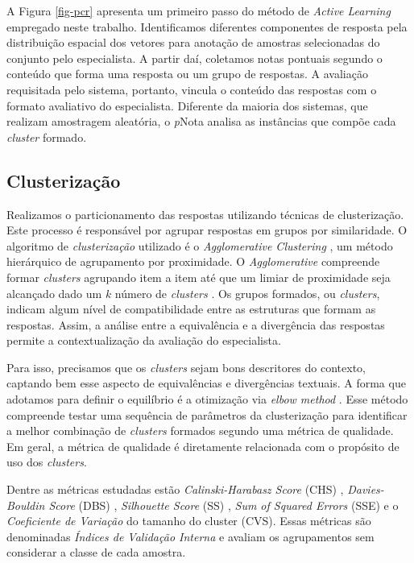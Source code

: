 A Figura \ref{fig-pcr} apresenta um primeiro passo do método de \textit{Active Learning} empregado neste trabalho. Identificamos diferentes componentes de resposta pela distribuição espacial dos vetores para anotação de amostras selecionadas do conjunto pelo especialista. A partir daí, coletamos notas pontuais segundo o conteúdo que forma uma resposta ou um grupo de respostas. A avaliação requisitada pelo sistema, portanto, vincula o conteúdo das respostas com o formato avaliativo do especialista. Diferente da maioria dos sistemas, que realizam amostragem aleatória, o \textit{p}Nota analisa as instâncias que compõe cada \textit{cluster} formado.


\subsection{Clusterização}
\label{subsec-clusterizacao}

Realizamos o particionamento das respostas utilizando técnicas de clusterização. Este processo é responsável por agrupar respostas em grupos por similaridade. O algoritmo de \textit{clusterização} utilizado é o \textit{Agglomerative Clustering} \cite{spalenza2019}, um método hierárquico de agrupamento por proximidade. O \textit{Agglomerative} compreende formar \textit{clusters} agrupando item a item até que um limiar de proximidade seja alcançado dado um $ k $ número de \textit{clusters} \cite{everitt2011}. Os grupos formados, ou \textit{clusters}, indicam algum nível de compatibilidade entre as estruturas que formam as respostas. Assim, a análise entre a equivalência e a divergência das respostas permite a contextualização da avaliação do especialista.

Para isso, precisamos que os \textit{clusters} sejam bons descritores do contexto, captando bem esse aspecto de equivalências e divergências textuais. A forma que adotamos para definir o equilíbrio é a otimização via \textit{elbow method} \cite{everitt2011}. Esse método compreende testar uma sequência de parâmetros da clusterização para identificar a melhor combinação de \textit{clusters} formados segundo uma métrica de qualidade. Em geral, a métrica de qualidade é diretamente relacionada com o propósito de uso dos \textit{clusters}.

Dentre as métricas estudadas estão \textit{Calinski-Harabasz Score} (CHS) \cite{calinskiharabasz1974}, \textit{Davies-Bouldin Score} (DBS) \cite{daviesbouldin1979}, \textit{Silhouette Score} (SS) \cite{rousseeuw1987}, \textit{Sum of Squared Errors} (SSE) \cite{maimon2005} e o \textit{Coeficiente de Variação} do tamanho do cluster (CVS). Essas métricas são denominadas \textit{Índices de Validação Interna} e avaliam os agrupamentos sem considerar a classe de cada amostra.

